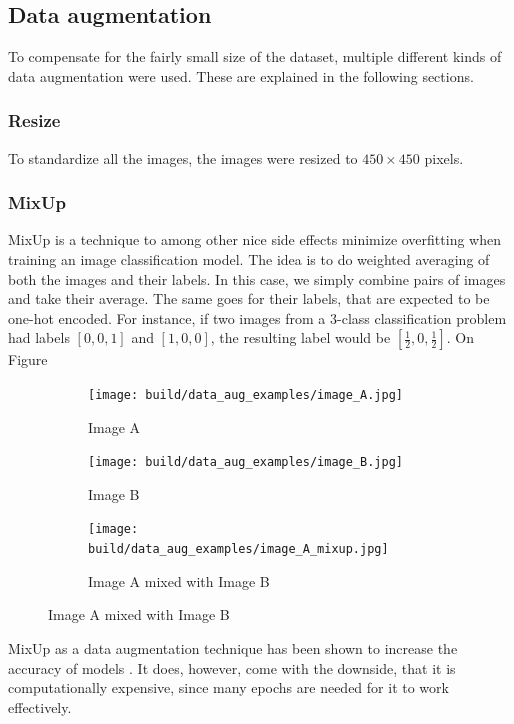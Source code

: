 \subsection{Data augmentation}
To compensate for the fairly small size of the dataset,
multiple different kinds of data augmentation were used.
These are explained in the following sections.
\subsubsection{Resize}
To standardize all the images, the images were resized to $450\times450$ pixels.

\subsubsection{MixUp} \label{sec:mixup}
MixUp is a technique to among other nice side effects minimize overfitting when training 
an image classification model.
The idea is to do weighted averaging of both the images and their labels.
In this case, we simply combine pairs of images and take their average.
The same goes for their labels, that are expected to be one-hot encoded.
For instance, if two images from a $3$-class classification problem had labels $[0,0,1]$ and $[1,0,0]$,
the resulting label would be $[\frac12,0,\frac12]$.
On Figure 
\begin{figure}
    \begin{subfigure}{0.3\textwidth}
        \texttt{[image: build/data\_aug\_examples/image\_A.jpg]}
        \caption{Image A}
        \label{fig:image-A}
    \end{subfigure}
    \begin{subfigure}{0.3\textwidth}
        \texttt{[image: build/data\_aug\_examples/image\_B.jpg]}
        \caption{Image B}
    \end{subfigure}
    \begin{subfigure}{0.3\textwidth}
        \texttt{[image: build/data\_aug\_examples/image\_A\_mixup.jpg]}
        \caption{Image A mixed with Image B}
    \end{subfigure}
    \label{fig:mixup-example}
\end{figure}

MixUp as a data augmentation technique has been shown to increase the accuracy of models \cite{mixup-paper}.
It does, however, come with the downside, that it is computationally expensive,
since many epochs are needed for it to work effectively.

